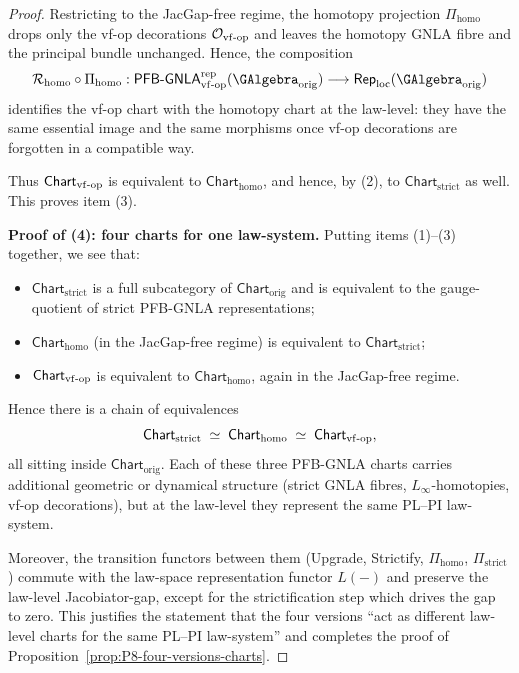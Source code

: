 \documentclass[11pt]{book}
\theoremstyle{plain}
\theoremstyle{definition}
\begin{document}
\begin{proof}
Restricting to the JacGap-free regime, the homotopy projection
\(\Pi_{\mathrm{homo}}\) drops only the vf-op decorations
\(\mathcal{O}_{\mathrm{vf\text- op}}\) and leaves the homotopy GNLA
fibre and the principal bundle unchanged.  Hence, the composition
\[
  \mathcal{R}_{\mathrm{homo}}\circ\Pi_{\mathrm{homo}} :
  \mathsf{PFB\text- GNLA}^{\mathrm{rep}}_{\mathrm{vf\text- op}}
    (\GAlgebra_{\mathrm{orig}})
  \longrightarrow
  \mathsf{Rep}_{\mathrm{loc}}(\GAlgebra_{\mathrm{orig}})
\]
identifies the vf-op chart with the homotopy chart at the law-level:
they have the same essential image and the same morphisms once vf-op
decorations are forgotten in a compatible way.

Thus \(\mathsf{Chart}_{\mathrm{vf\text- op}}\) is equivalent to
\(\mathsf{Chart}_{\mathrm{homo}}\), and hence, by \textnormal{(2)}, to
\(\mathsf{Chart}_{\mathrm{strict}}\) as well.  This proves item
\textnormal{(3)}.



\medskip\noindent
\textbf{Proof of (4): four charts for one law-system.}
Putting items \textnormal{(1)}–\textnormal{(3)} together, we see that:
\begin{itemize}
  \item \(\mathsf{Chart}_{\mathrm{strict}}\) is a full subcategory of
        \(\mathsf{Chart}_{\mathrm{orig}}\) and is equivalent to the
        gauge-quotient of strict PFB-GNLA representations;
  \item \(\mathsf{Chart}_{\mathrm{homo}}\) (in the JacGap-free
        regime) is equivalent to
        \(\mathsf{Chart}_{\mathrm{strict}}\);
  \item \(\mathsf{Chart}_{\mathrm{vf\text- op}}\) is equivalent to
        \(\mathsf{Chart}_{\mathrm{homo}}\), again in the JacGap-free
        regime.
\end{itemize}
Hence there is a chain of equivalences
\[
  \mathsf{Chart}_{\mathrm{strict}}
  \;\simeq\;
  \mathsf{Chart}_{\mathrm{homo}}
  \;\simeq\;
  \mathsf{Chart}_{\mathrm{vf\text- op}},
\]
all sitting inside \(\mathsf{Chart}_{\mathrm{orig}}\).  Each of these
three PFB-GNLA charts carries additional geometric or dynamical
structure (strict GNLA fibres, \(L_\infty\)-homotopies, vf-op
decorations), but at the law-level they represent the same PL--PI
law-system.

Moreover, the transition functors between them (Upgrade, Strictify,
\(\Pi_{\mathrm{homo}}\), \(\Pi_{\mathrm{strict}}\)) commute with the
law-space representation functor \(L(-)\) and preserve the law-level
Jacobiator-gap, except for the strictification step which drives the
gap to zero.  This justifies the statement that the four versions
“act as different law-level charts for the same PL--PI law-system” and
completes the proof of
Proposition~\ref{prop:P8-four-versions-charts}.



\end{proof}
\end{document}

